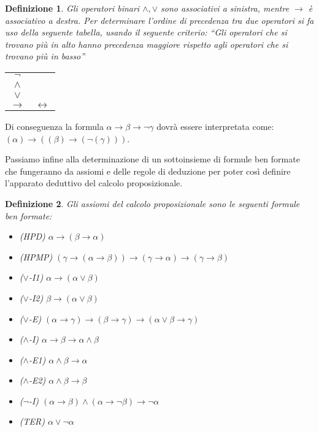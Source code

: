 \documentclass[a4paper, 12pt]{article}
\newtheorem{definition}{Definizione}
\begin{document}
\begin{definition}
Gli operatori binari $\wedge,\vee$ sono associativi a sinistra,
mentre $\rightarrow$ è associativo a destra.
Per determinare l'ordine di precedenza tra due operatori si fa uso della
seguente tabella, usando il seguente criterio:
``Gli operatori che si trovano più in alto hanno precedenza maggiore rispetto
agli operatori che si trovano più in basso''
\begin{center}
\begin{tabular} {c c}
    $\neg$ \\
    $\wedge$ \\
    $\vee$ \\
    $\rightarrow$ & $\leftrightarrow$
\end{tabular}
\end{center}
\end{definition}

Di conseguenza la formula $\alpha \rightarrow \beta \rightarrow \neg \gamma$
dovrà essere interpretata come:
$(\alpha) \rightarrow ((\beta) \rightarrow (\neg (\gamma)))$.

Passiamo infine alla determinazione di un sottoinsieme di formule ben formate
che fungeranno da assiomi e delle regole di deduzione
per poter così definire l'apparato deduttivo del calcolo proposizionale.

\begin{definition}
Gli assiomi del calcolo proposizionale sono le seguenti formule ben formate:
\begin{itemize}
\item (HPD) $\alpha \rightarrow (\beta \rightarrow \alpha)$
\item (HPMP) $(\gamma \rightarrow (\alpha \rightarrow \beta)) \rightarrow (\gamma \rightarrow \alpha) \rightarrow (\gamma \rightarrow \beta)$
\item ($\vee$-I1) $\alpha \rightarrow (\alpha \vee \beta)$
\item ($\vee$-I2) $\beta \rightarrow (\alpha \vee \beta)$
\item ($\vee$-E) $(\alpha \rightarrow \gamma) \rightarrow (\beta \rightarrow \gamma) \rightarrow (\alpha \vee \beta \rightarrow \gamma)$
\item ($\wedge$-I) $\alpha \rightarrow \beta \rightarrow \alpha \wedge \beta$
\item ($\wedge$-E1) $\alpha \wedge \beta \rightarrow \alpha$
\item ($\wedge$-E2) $\alpha \wedge \beta \rightarrow \beta$
\item ($\neg$-I) $(\alpha \rightarrow \beta) \wedge (\alpha \rightarrow \neg \beta) \rightarrow \neg \alpha$
\item (TER) $\alpha \vee \neg \alpha$
\end{itemize}
\end{definition}
\end{document}
